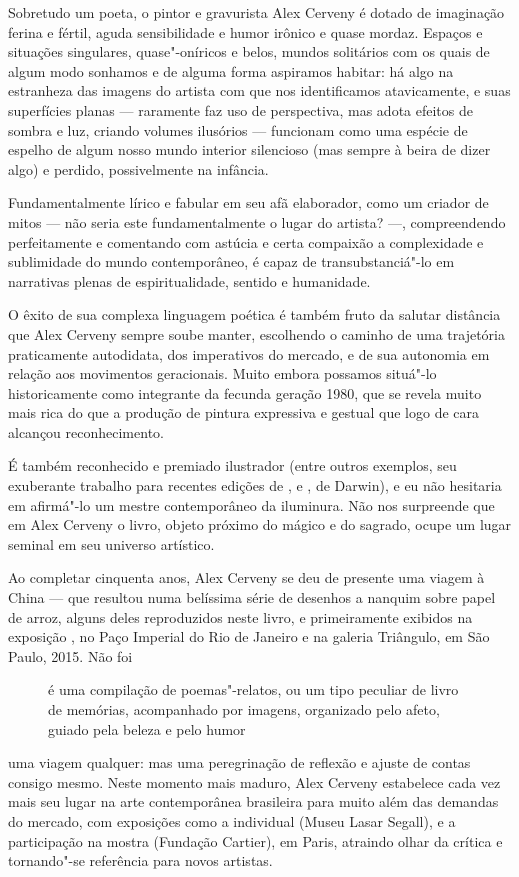 \begin{multicols}{2}
Sobretudo um poeta, o pintor e gravurista Alex Cerveny é dotado de imaginação ferina e fértil, aguda sensibilidade e humor irônico e quase mordaz. Espaços e situações singulares, quase"-oníricos e belos, mundos solitários com os quais de algum modo sonhamos e de alguma forma aspiramos habitar: há algo na estranheza das imagens do artista com que nos identificamos atavicamente, e suas superfícies planas — raramente faz uso de perspectiva, mas adota efeitos de sombra e luz, criando volumes ilusórios — funcionam como uma espécie de espelho de algum nosso mundo interior silencioso (mas sempre à beira de dizer algo) e perdido, possivelmente na infância.

Fundamentalmente lírico e fabular em seu afã elaborador, como um criador de mitos — não seria este fundamentalmente o lugar do artista? —, compreendendo perfeitamente e comentando com astúcia e certa compaixão a complexidade e sublimidade do mundo contemporâneo, é capaz de transubstanciá"-lo em narrativas plenas de espiritualidade, sentido e humanidade.

O êxito de sua complexa linguagem poética é também fruto da salutar distância que Alex Cerveny sempre soube manter, escolhendo o caminho de uma trajetória praticamente autodidata, dos imperativos do mercado, e de sua autonomia em relação aos movimentos geracionais. Muito embora possamos situá"-lo historicamente como integrante da fecunda geração 1980, que se revela muito mais rica do que a produção de pintura expressiva e gestual que logo de cara alcançou reconhecimento. 

É também reconhecido e premiado ilustrador (entre outros exemplos, seu exuberante trabalho para recentes edições de {}, {} e {}, de Darwin), e eu não hesitaria em afirmá"-lo um mestre contemporâneo da iluminura. Não nos surpreende que em Alex Cerveny o livro, objeto próximo do mágico e do sagrado, ocupe um lugar seminal em seu universo artístico.

Ao completar cinquenta anos, Alex Cerveny se deu de presente uma viagem à China — que resultou numa belíssima série de desenhos a nanquim sobre
papel de arroz, alguns deles reproduzidos neste livro, e primeiramente exibidos na exposição {}, no Paço Imperial do Rio de Janeiro e na galeria Triângulo, em São Paulo, 2015. Não foi
\begin{figure}
{\large
{} é uma compilação de poemas"-relatos, ou um tipo peculiar de livro de memórias, acompanhado por imagens, organizado pelo afeto, guiado pela beleza e pelo humor
}
\end{figure}
uma viagem qualquer: mas uma peregrinação de reflexão e ajuste de contas consigo mesmo. Neste momento mais maduro, Alex Cerveny estabelece cada vez mais seu lugar na arte contemporânea brasileira para muito além das demandas do mercado, com exposições como a individual {} (Museu Lasar Segall), e a participação na mostra {} (Fundação Cartier), em Paris, atraindo olhar da crítica e tornando"-se referência para novos artistas. 


\end{multicols}
